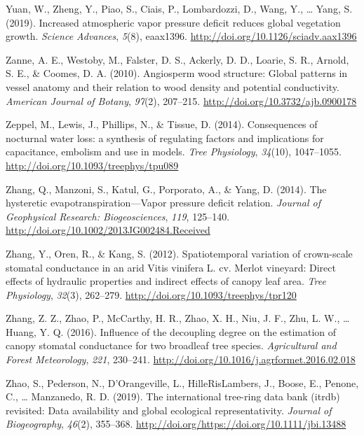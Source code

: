 \documentclass[11pt,twoside]{reedthesis}
\begin{document}
\hypertarget{ref-yuan_increased_2019}{}
Yuan, W., Zheng, Y., Piao, S., Ciais, P., Lombardozzi, D., Wang, Y.,
\ldots{} Yang, S. (2019). Increased atmospheric vapor pressure deficit
reduces global vegetation growth. \emph{Science Advances}, \emph{5}(8),
eaax1396. \url{http://doi.org/10.1126/sciadv.aax1396}

\hypertarget{ref-Zanne2010}{}
Zanne, A. E., Westoby, M., Falster, D. S., Ackerly, D. D., Loarie, S.
R., Arnold, S. E., \& Coomes, D. A. (2010). Angiosperm wood structure:
Global patterns in vessel anatomy and their relation to wood density and
potential conductivity. \emph{American Journal of Botany}, \emph{97}(2),
207--215. \url{http://doi.org/10.3732/ajb.0900178}

\hypertarget{ref-Zeppel2014}{}
Zeppel, M., Lewis, J., Phillips, N., \& Tissue, D. (2014). Consequences
of nocturnal water loss: a synthesis of regulating factors and
implications for capacitance, embolism and use in models. \emph{Tree
Physiology}, \emph{34}(10), 1047--1055.
\url{http://doi.org/10.1093/treephys/tpu089}

\hypertarget{ref-Zhang2014}{}
Zhang, Q., Manzoni, S., Katul, G., Porporato, A., \& Yang, D. (2014).
The hysteretic evapotranspiration---Vapor pressure deficit relation.
\emph{Journal of Geophysical Research: Biogeosciences}, \emph{119},
125--140. \url{http://doi.org/10.1002/2013JG002484.Received}

\hypertarget{ref-zhang_spatiotemporal_2012}{}
Zhang, Y., Oren, R., \& Kang, S. (2012). Spatiotemporal variation of
crown-scale stomatal conductance in an arid Vitis vinifera L. cv. Merlot
vineyard: Direct effects of hydraulic properties and indirect effects of
canopy leaf area. \emph{Tree Physiology}, \emph{32}(3), 262--279.
\url{http://doi.org/10.1093/treephys/tpr120}

\hypertarget{ref-zhang_influence_2016}{}
Zhang, Z. Z., Zhao, P., McCarthy, H. R., Zhao, X. H., Niu, J. F., Zhu,
L. W., \ldots{} Huang, Y. Q. (2016). Influence of the decoupling degree
on the estimation of canopy stomatal conductance for two broadleaf tree
species. \emph{Agricultural and Forest Meteorology}, \emph{221},
230--241. \url{http://doi.org/10.1016/j.agrformet.2016.02.018}

\hypertarget{ref-Zhao2019}{}
Zhao, S., Pederson, N., D'Orangeville, L., HilleRisLambers, J., Boose,
E., Penone, C., \ldots{} Manzanedo, R. D. (2019). The international
tree-ring data bank (itrdb) revisited: Data availability and global
ecological representativity. \emph{Journal of Biogeography},
\emph{46}(2), 355--368.
\url{http://doi.org/https://doi.org/10.1111/jbi.13488}
\end{document}

